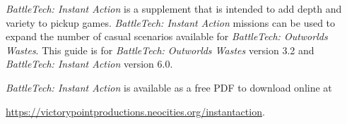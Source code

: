 \emph{BattleTech: Instant Action} is a supplement that is intended to add depth and variety to pickup games.
\emph{BattleTech: Instant Action} missions can be used to expand the number of casual scenarios available for \emph{BattleTech: Outworlds Wastes}.
This guide is for \emph{BattleTech: Outworlds Wastes} version 3.2 and \emph{BattleTech: Instant Action} version 6.0.

\emph{BattleTech: Instant Action} is available as a free PDF to download online at

 \href{https://victorypointproductions.neocities.org/instantaction}{https://victorypointproductions.neocities.org/instantaction}.
